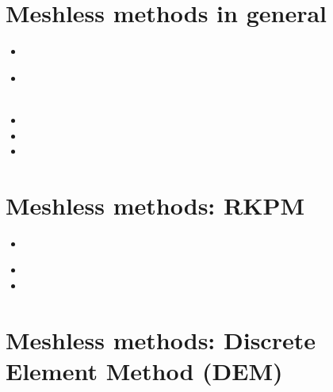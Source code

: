 \section{Meshless methods in general}

\begin{small}
\begin{itemize}
\item[\nineteenninetysix]
\item[\twothousand]
\\ 
\\
\item[\twothousandone]
\item[\twothousandtwo]
\item[\twothousandfour]
\end{itemize}
\end{small}


\section{Meshless methods: RKPM}

\begin{small}
\begin{itemize}
\item[\twothousand]
\\
\item[\twothousandtwo]  
\item[\twothousandfour] 
\end{itemize}
\end{small}

\section{Meshless methods: Discrete Element Method (DEM)}

